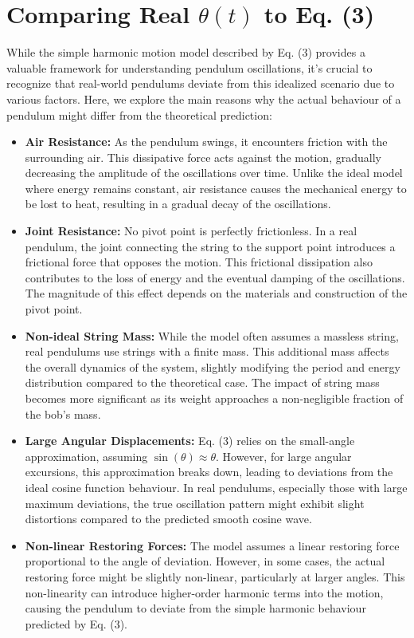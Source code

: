 \section{Comparing Real $\theta (t)$ to Eq. (3)}

While the simple harmonic motion model described by Eq. (3) provides a valuable framework for understanding pendulum oscillations, it's crucial to recognize that real-world pendulums deviate from this idealized scenario due to various factors. Here, we explore the main reasons why the actual behaviour of a pendulum might differ from the theoretical prediction:

\begin{itemize}
	\item \textbf{Air Resistance:} As the pendulum swings, it encounters friction with the surrounding air. This dissipative force acts against the motion, gradually decreasing the amplitude of the oscillations over time. Unlike the ideal model where energy remains constant, air resistance causes the mechanical energy to be lost to heat, resulting in a gradual decay of the oscillations.
	\item \textbf{Joint Resistance:} No pivot point is perfectly frictionless. In a real pendulum, the joint connecting the string to the support point introduces a frictional force that opposes the motion. This frictional dissipation also contributes to the loss of energy and the eventual damping of the oscillations. The magnitude of this effect depends on the materials and construction of the pivot point.
	\item \textbf{Non-ideal String Mass:} While the model often assumes a massless string, real pendulums use strings with a finite mass. This additional mass affects the overall dynamics of the system, slightly modifying the period and energy distribution compared to the theoretical case. The impact of string mass becomes more significant as its weight approaches a non-negligible fraction of the bob's mass.
	\item \textbf{Large Angular Displacements:} Eq. (3) relies on the small-angle approximation, assuming $\sin(\theta) \approx \theta$. However, for large angular excursions, this approximation breaks down, leading to deviations from the ideal cosine function behaviour. In real pendulums, especially those with large maximum deviations, the true oscillation pattern might exhibit slight distortions compared to the predicted smooth cosine wave. 
	
	\newpage
	\thispagestyle{plain}

	\item \textbf{Non-linear Restoring Forces:} The model assumes a linear restoring force proportional to the angle of deviation. However, in some cases, the actual restoring force might be slightly non-linear, particularly at larger angles. This non-linearity can introduce higher-order harmonic terms into the motion, causing the pendulum to deviate from the simple harmonic behaviour predicted by Eq. (3).
\end{itemize}

